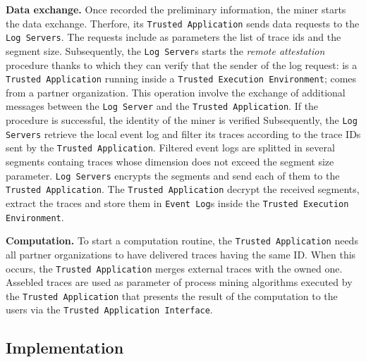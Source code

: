 \textbf{Data exchange.} Once recorded the preliminary information, the miner starts the data exchange. Therfore, its \texttt{Trusted Application} sends data requests to the \texttt{Log Servers}. The requests include as parameters the list of trace ids and the segment size. Subsequently, the \texttt{Log Server}s starts the \textit{remote attestation} procedure thanks to which they can verify that the sender of the log request: is a \texttt{Trusted Application} running inside a \texttt{Trusted Execution Environment}; comes from a partner organization. This operation involve the exchange of additional messages between the \texttt{Log Server} and the \texttt{Trusted Application}. If the procedure is successful, the identity of the miner is verified %
Subsequently, the \texttt{Log Servers} retrieve the local event log and filter its traces according to the trace IDs sent by the \texttt{Trusted Application}. Filtered event logs are splitted in several segments containg traces whose dimension does not exceed the segment size parameter. \texttt{Log Servers} encrypts the segments and send each of them to the \texttt{Trusted Application}. The \texttt{Trusted Application} decrypt the received segments, extract the traces and store them in \texttt{Event Log}s inside the \texttt{Trusted Execution Environment}.

\textbf{Computation.} To start a computation routine, the \texttt{Trusted Application} needs all partner organizations to have delivered traces having the same ID. When this occurs, the \texttt{Trusted Application} merges external traces with the owned one. Assebled traces are used as parameter of process mining algorithms executed by the \texttt{Trusted Application} that presents the result of the computation to the users via the \texttt{Trusted Application Interface}.
\subsection{Implementation}



